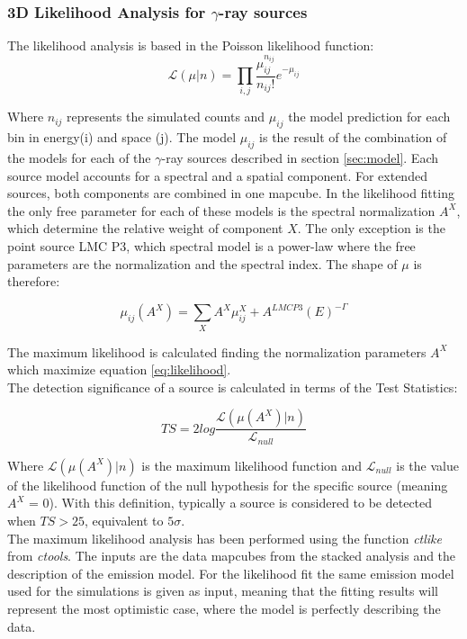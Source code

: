 \documentclass[main.tex]{subfiles}
\begin{document}
\subsubsection{3D Likelihood Analysis for $\gamma$-ray sources}

The likelihood analysis is based in the Poisson likelihood function:
\begin{equation}
  \mathcal{L}(\mu | n) = \prod_{i,j}\frac{\mu_{ij}^{n_{ij}}}{n_{ij}!}e^{-\mu_{ij}}
  \label{eq:likelihood}
\end{equation}

Where $n_{ij}$ represents the simulated counts and $\mu_{ij}$ the model prediction for each bin in energy(i) and space (j). The model $\mu_{ij}$ is the result of the combination of the models for each of the $\gamma$-ray sources described in section \ref{sec:model}. Each source model accounts for a spectral and a spatial component. For extended sources, both components are combined in one mapcube. In the likelihood fitting the only free parameter for each of these models is the spectral normalization $A^{X}$, which determine the relative weight of component $X$. The only exception is the point source LMC P3, which spectral model is a power-law where the free parameters are the normalization and the spectral index. The shape of $\mu$ is therefore:

\begin{equation}
  \mu_{ij}(A^{X}) = \sum_{X} A^{X} \mu^{X}_{ij} + A^{LMC P3}(E)^{-\Gamma}
\end{equation}

The maximum likelihood is calculated finding the normalization parameters $A^{X}$ which maximize equation \ref{eq:likelihood}.\\
The detection significance of a source is calculated in terms of the Test Statistics:

\begin{equation}
  TS = 2log \frac{\mathcal{L}(\mu(A^{X})|n)}{\mathcal{L}_{null}}
  \label{eq:ts}
\end{equation}

Where $\mathcal{L}(\mu(A^{X})|n)$ is the maximum likelihood function and $\mathcal{L}_{null}$ is the value of the likelihood function of the null hypothesis for the specific source (meaning $A^X$ = 0). With this definition, typically a source is considered to be detected when $TS>25$, equivalent to $5\sigma$.\\
The maximum likelihood analysis has been performed using the function \textit{ctlike} from \textit{ctools}. The inputs are the data mapcubes from the stacked analysis and the description of the emission model. For the likelihood fit the same emission model used for the simulations is given as input, meaning that the fitting results will represent the most optimistic case, where the model is perfectly describing the data. 
\end{document}
